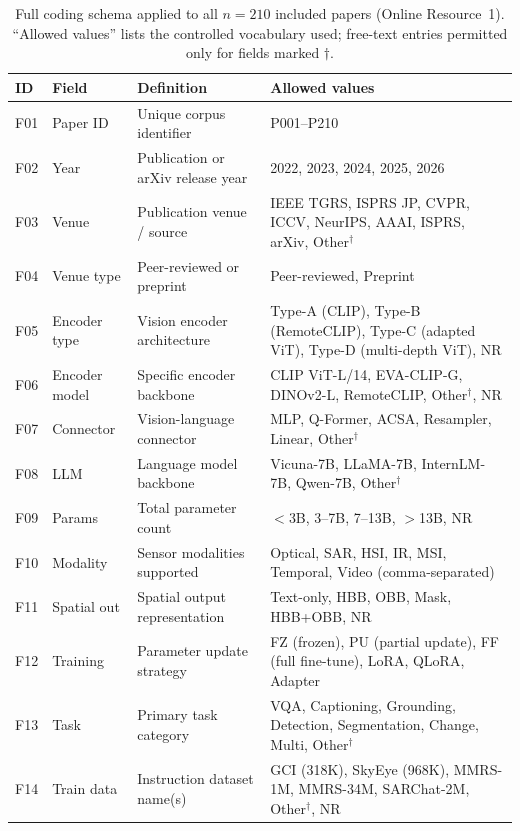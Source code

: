 \begin{table}[h]
\caption{Full coding schema applied to all $n=210$ included papers
(Online Resource~1). ``Allowed values'' lists the controlled vocabulary used;
free-text entries permitted only for fields marked $\dagger$.
}\label{tab:coding_schema}
\small\setlength\tabcolsep{3pt}
\begin{tabular*}{\textwidth}{@{\extracolsep\fill}p{0.55cm}p{1.8cm}p{4.8cm}p{5.2cm}}
\toprule
\textbf{ID} & \textbf{Field} & \textbf{Definition} & \textbf{Allowed values} \\
\midrule
F01 & Paper ID     & Unique corpus identifier & P001--P210 \\
F02 & Year         & Publication or arXiv release year & 2022, 2023, 2024, 2025, 2026 \\
F03 & Venue        & Publication venue / source & IEEE TGRS, ISPRS JP, CVPR, ICCV, NeurIPS, AAAI, ISPRS, arXiv, Other$^\dagger$ \\
F04 & Venue type   & Peer-reviewed or preprint & Peer-reviewed, Preprint \\
F05 & Encoder type & Vision encoder architecture & Type-A (CLIP), Type-B (RemoteCLIP), Type-C (adapted ViT), Type-D (multi-depth ViT), NR \\
F06 & Encoder model & Specific encoder backbone & CLIP ViT-L/14, EVA-CLIP-G, DINOv2-L, RemoteCLIP, Other$^\dagger$, NR \\
F07 & Connector    & Vision-language connector & MLP, Q-Former, ACSA, Resampler, Linear, Other$^\dagger$ \\
F08 & LLM          & Language model backbone & Vicuna-7B, LLaMA-7B, InternLM-7B, Qwen-7B, Other$^\dagger$ \\
F09 & Params       & Total parameter count & $<$3B, 3--7B, 7--13B, $>$13B, NR \\
F10 & Modality     & Sensor modalities supported & Optical, SAR, HSI, IR, MSI, Temporal, Video (comma-separated) \\
F11 & Spatial out  & Spatial output representation & Text-only, HBB, OBB, Mask, HBB+OBB, NR \\
F12 & Training     & Parameter update strategy & FZ (frozen), PU (partial update), FF (full fine-tune), LoRA, QLoRA, Adapter \\
F13 & Task         & Primary task category & VQA, Captioning, Grounding, Detection, Segmentation, Change, Multi, Other$^\dagger$ \\
F14 & Train data   & Instruction dataset name(s) & GCI (318K), SkyEye (968K), MMRS-1M, MMRS-34M, SARChat-2M, Other$^\dagger$, NR \\

\end{tabular*}
\end{table}
